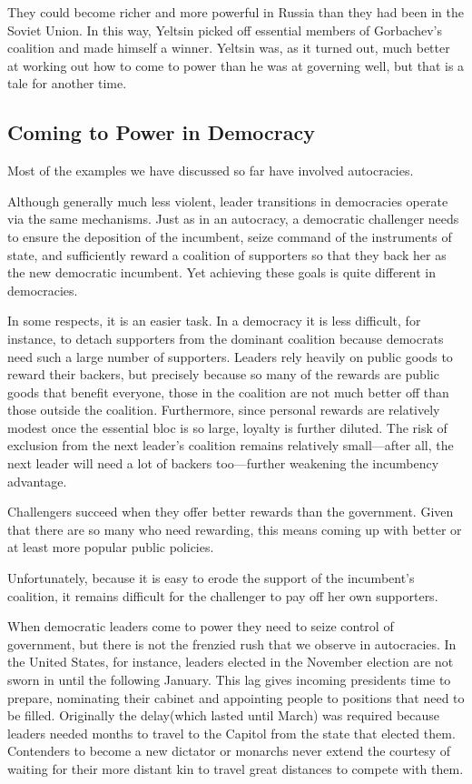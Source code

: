 \documentclass[10pt]{article}
\begin{document}
{\large They could become richer and more powerful in Russia than they had been
in the Soviet Union. In this way, Yeltsin picked off essential members of
Gorbachev's coalition and made himself a winner. Yeltsin was, as it turned out,
much better at working out how to come to power than he was at governing well,
but that is a tale for another time.}

\subsection{Coming to Power in Democracy}

{\large Most of the examples we have discussed so far have involved
autocracies.}

{\large Although generally much less violent, leader transitions in democracies
operate via the same mechanisms. Just as in an autocracy, a democratic challenger
needs to ensure the deposition of the incumbent, seize command of the instruments
of state, and sufficiently reward a coalition of supporters so that they back her
as the new democratic incumbent. Yet achieving these goals is quite different in
democracies.}

{\large In some respects, it is an easier task. In a democracy it is less
difficult, for instance, to detach supporters from the dominant coalition because
democrats need such a large number of supporters. Leaders rely heavily on public
goods to reward their backers, but precisely because so many of the rewards are
public goods that benefit everyone, those in the coalition are not much better
off than those outside the coalition. Furthermore, since personal rewards are
relatively modest once the essential bloc is so large, loyalty is further
diluted. The risk of exclusion from the next leader's coalition remains
relatively small---after all, the next leader will need a lot of backers
too---further weakening the incumbency advantage.}

{\large Challengers succeed when they offer better rewards than the government.
Given that there are so many who need rewarding, this means coming up with better
or at least more popular public policies.}

{\large Unfortunately, because it is easy to erode the support of the
incumbent's coalition, it remains difficult for the challenger to pay off her own
supporters.}

{\large When democratic leaders come to power they need to seize control of
government, but there is not the frenzied rush that we observe in autocracies. In
the United States, for instance, leaders elected in the November election are not
sworn in until the following January. This lag gives incoming presidents time to
prepare, nominating their cabinet and appointing people to positions that need to
be filled. Originally the delay(which lasted until March) was required because
leaders needed months to travel to the Capitol from the state that elected them.
Contenders to become a new dictator or monarchs never extend the courtesy of
waiting for their more distant kin to travel great distances to compete with
them.}
\end{document}
